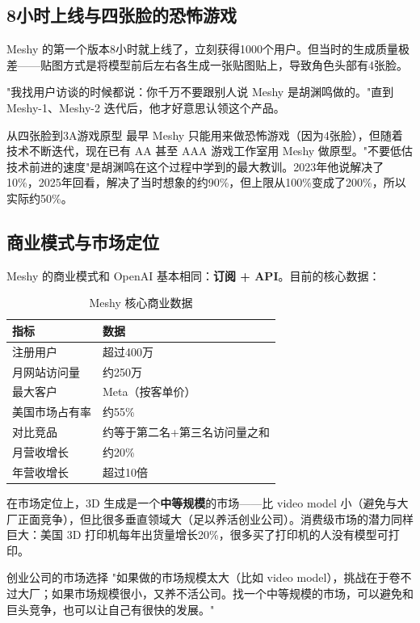\documentclass[a4paper]{article}
\begin{document}
\subsection{8小时上线与四张脸的恐怖游戏}

Meshy 的第一个版本8小时就上线了，立刻获得1000个用户。但当时的生成质量极差——贴图方式是将模型前后左右各生成一张贴图贴上，导致角色头部有4张脸。

"我找用户访谈的时候都说：你千万不要跟别人说 Meshy 是胡渊鸣做的。"直到 Meshy-1、Meshy-2 迭代后，他才好意思认领这个产品。

\begin{knowledgebox}{从四张脸到3A游戏原型}
最早 Meshy 只能用来做恐怖游戏（因为4张脸），但随着技术不断迭代，现在已有 AA 甚至 AAA 游戏工作室用 Meshy 做原型。"不要低估技术前进的速度"是胡渊鸣在这个过程中学到的最大教训。2023年他说解决了10\%，2025年回看，解决了当时想象的约90\%，但上限从100\%变成了200\%，所以实际约50\%。
\end{knowledgebox}

\subsection{商业模式与市场定位}

Meshy 的商业模式和 OpenAI 基本相同：\textbf{订阅 + API}。目前的核心数据：

\begin{table}[H]
\centering
\caption{Meshy 核心商业数据}
\begin{tabular}{ll}
\toprule
\textbf{指标} & \textbf{数据} \\
\midrule
注册用户 & 超过400万 \\
月网站访问量 & 约250万 \\
最大客户 & Meta（按客单价） \\
美国市场占有率 & 约55\% \\
对比竞品 & 约等于第二名+第三名访问量之和 \\
月营收增长 & 约20\% \\
年营收增长 & 超过10倍 \\
\bottomrule
\end{tabular}
\end{table}

在市场定位上，3D 生成是一个\textbf{中等规模}的市场——比 video model 小（避免与大厂正面竞争），但比很多垂直领域大（足以养活创业公司）。消费级市场的潜力同样巨大：美国 3D 打印机每年出货量增长20\%，很多买了打印机的人没有模型可打印。

\begin{warningbox}{创业公司的市场选择}
"如果做的市场规模太大（比如 video model），挑战在于卷不过大厂；如果市场规模很小，又养不活公司。找一个中等规模的市场，可以避免和巨头竞争，也可以让自己有很快的发展。"
\end{warningbox}
\end{document}
